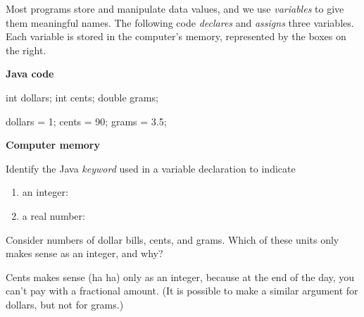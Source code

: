 
Most programs store and manipulate data values, and we use \emph{variables} to give them meaningful names.
The following code \emph{declares} and \emph{assigns} three variables.
Each variable is stored in the computer's memory, represented by the boxes on the right.

\vspace{1em}
\hfill
\begin{minipage}[t]{0.5\textwidth}

\textbf{Java code}
\vspace{1ex}

\begin{javalst}
int dollars;
int cents;
double grams;

dollars = 1;
cents = 90;
grams = 3.5;
\end{javalst}

\end{minipage}
\hfill
\begin{minipage}[t]{0.4\textwidth}

\textbf{Computer memory}
\vspace{1em}

\par\vspace{1em}
\par\vspace{1em}

\end{minipage}




\Q Identify the Java \emph{keyword} used in a variable declaration to indicate

\begin{enumerate}
\item an integer: 
\item a real number: 
\end{enumerate}


\Q Consider numbers of dollar bills, cents, and grams.
Which of these units only makes sense as an integer, and why?

\begin{answer}
Cents makes sense (ha ha) only as an integer, because at the end of the day, you can't pay with a fractional amount. (It is possible to make a similar argument for dollars, but not for grams.)
\end{answer}


